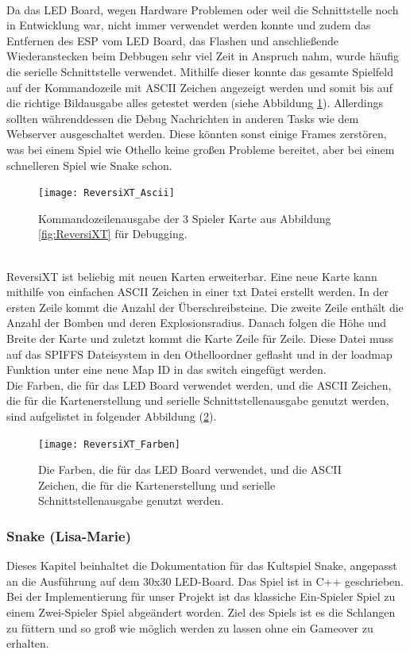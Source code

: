 \documentclass[12pt,a4paper]{article}
\begin{document}
\vspace{1ex}\\
Da das LED Board, wegen Hardware Problemen oder weil die Schnittstelle noch in Entwicklung war, nicht immer verwendet werden konnte und zudem das Entfernen des ESP vom LED Board, das Flashen und anschließende Wiederanstecken beim Debbugen sehr viel Zeit in Anspruch nahm, wurde häufig die serielle Schnittstelle verwendet. Mithilfe dieser konnte das gesamte Spielfeld auf der Kommandozeile mit ASCII Zeichen angezeigt werden und somit bis auf die richtige Bildausgabe alles getestet werden (siehe Abbildung \ref{fig:ReversiXT_Ascii}). Allerdings sollten währenddessen die Debug Nachrichten in anderen Tasks wie dem Webserver ausgeschaltet werden. Diese könnten sonst einige Frames zerstören, was bei einem Spiel wie Othello keine großen Probleme bereitet, aber bei einem schnelleren Spiel wie Snake schon.
\begin{figure}[h]
\centering
\texttt{[image: ReversiXT\_Ascii]}
\caption{\label{fig:ReversiXT_Ascii}Kommandozeilenausgabe der 3 Spieler Karte aus Abbildung \ref{fig:ReversiXT} für Debugging.}
\end{figure}
\vspace{1ex}\\
ReversiXT ist beliebig mit neuen Karten erweiterbar. Eine neue Karte kann mithilfe von einfachen ASCII Zeichen in einer txt Datei erstellt werden. In der ersten Zeile kommt die Anzahl der Überschreibsteine. Die zweite Zeile enthält die Anzahl der Bomben und deren Explosionsradius. Danach folgen die Höhe und Breite der Karte und zuletzt kommt die Karte Zeile für Zeile. Diese Datei muss auf das SPIFFS Dateisystem in den Othelloordner geflasht und in der loadmap Funktion unter eine neue Map ID in das switch eingefügt werden.
\vspace{1ex}\\
Die Farben, die für das LED Board verwendet werden, und die ASCII Zeichen, die für die Kartenerstellung und serielle Schnittstellenausgabe genutzt werden, sind aufgelistet in folgender Abbildung (\ref{fig:ReversiXT_Farben}).
\begin{figure}
\centering
\texttt{[image: ReversiXT\_Farben]}
\caption{\label{fig:ReversiXT_Farben}Die Farben, die für das LED Board verwendet, und die ASCII Zeichen, die für die Kartenerstellung und serielle Schnittstellenausgabe genutzt werden.}
\end{figure}

\newpage
\subsubsection{Snake  (Lisa-Marie)}
Dieses Kapitel beinhaltet die Dokumentation für das Kultspiel Snake, angepasst an die Ausführung auf dem 30x30 LED-Board. Das Spiel ist in C++ geschrieben. Bei der Implementierung für unser Projekt ist das klassiche Ein-Spieler Spiel zu einem Zwei-Spieler Spiel abgeändert worden. Ziel des Spiels ist es die Schlangen zu füttern und so groß wie möglich werden zu lassen ohne ein Gameover zu erhalten.
\end{document}
